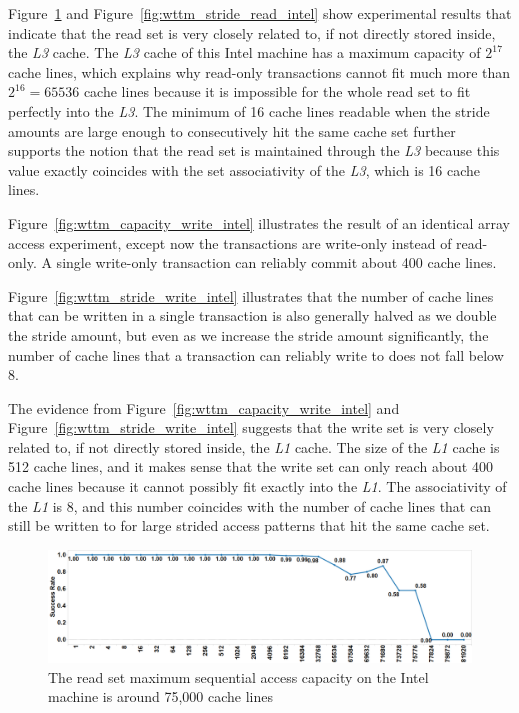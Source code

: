 Figure~\ref{fig:wttm_capacity_read_intel} and
Figure~\ref{fig:wttm_stride_read_intel} show experimental results that indicate
that the read set is very closely related to, if not directly stored inside, the
\textit{L3} cache. The \textit{L3} cache of this Intel machine has a maximum
capacity of $2^{17}$ cache lines, which explains why read-only transactions
cannot fit much more than $2^{16}=65536$ cache lines because it is impossible
for the whole read set to fit perfectly into the \textit{L3}. The minimum of 16
cache lines readable when the stride amounts are large enough to consecutively
hit the same cache set further supports the notion that the read set is
maintained through the \textit{L3} because this value exactly coincides with the
set associativity of the \textit{L3}, which is 16 cache lines.

Figure~\ref{fig:wttm_capacity_write_intel} illustrates the result of an
identical array access experiment, except now the transactions are write-only
instead of read-only. A single write-only transaction can reliably commit about
400 cache lines.

Figure~\ref{fig:wttm_stride_write_intel} illustrates that the number of cache
lines that can be written in a single transaction is also generally halved as we
double the stride amount, but even as we increase the stride amount
significantly, the number of cache lines that a transaction can reliably write
to does not fall below 8.

The evidence from Figure~\ref{fig:wttm_capacity_write_intel} and
Figure~\ref{fig:wttm_stride_write_intel} suggests that the write set is very
closely related to, if not directly stored inside, the \textit{L1} cache. The
size of the \textit{L1} cache is 512 cache lines, and it makes sense that the
write set can only reach about 400 cache lines because it cannot possibly fit
exactly into the \textit{L1}. The associativity of the \textit{L1} is 8, and
this number coincides with the number of cache lines that can still be written
to for large strided access patterns that hit the same cache set.

\begin{figure}[]%
\centering
{}
\includegraphics[width=\linewidth]{images/wttm_capacity_read_intel}
\caption{The read set maximum sequential access capacity on the Intel machine is
around 75,000 cache lines}
\label{fig:wttm_capacity_read_intel}
\end{figure}

